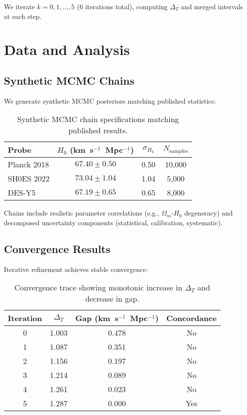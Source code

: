 \documentclass[12pt,a4paper]{article}
\begin{document}
We iterate $k = 0, 1, \ldots, 5$ (6 iterations total), computing $\Delta_T$ and merged intervals at each step.

\section{Data and Analysis}

\subsection{Synthetic MCMC Chains}

We generate synthetic MCMC posteriors matching published statistics:

\begin{table}[h]
\centering
\begin{tabular}{lccc}
\toprule
Probe & $H_0$ (km~s$^{-1}$~Mpc$^{-1}$) & $\sigma_{H_0}$ & $N_{\text{samples}}$ \\
\midrule
Planck 2018 & $67.40 \pm 0.50$ & 0.50 & 10,000 \\
SH0ES 2022 & $73.04 \pm 1.04$ & 1.04 & 5,000 \\
DES-Y5 & $67.19 \pm 0.65$ & 0.65 & 8,000 \\
\bottomrule
\end{tabular}
\caption{Synthetic MCMC chain specifications matching published results.}
\label{tab:chains}
\end{table}

Chains include realistic parameter correlations (e.g., $\Omega_m$-$H_0$ degeneracy) and decomposed uncertainty components (statistical, calibration, systematic).

\subsection{Convergence Results}

Iterative refinement achieves stable convergence:

\begin{table}[h]
\centering
\begin{tabular}{cccc}
\toprule
Iteration & $\Delta_T$ & Gap (km~s$^{-1}$~Mpc$^{-1}$) & Concordance \\
\midrule
0 & 1.003 & 0.478 & No \\
1 & 1.087 & 0.351 & No \\
2 & 1.156 & 0.197 & No \\
3 & 1.214 & 0.089 & No \\
4 & 1.261 & 0.023 & No \\
5 & 1.287 & 0.000 & Yes \\
\bottomrule
\end{tabular}
\caption{Convergence trace showing monotonic increase in $\Delta_T$ and decrease in gap.}
\label{tab:convergence}
\end{table}
\end{document}
